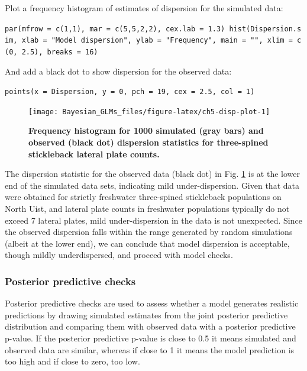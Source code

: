 \documentclass[
]{book}
\begin{document}
Plot a frequency histogram of estimates of dispersion for the simulated data:

\texttt{par(mfrow\ =\ c(1,1),\ mar\ =\ c(5,5,2,2),\ cex.lab\ =\ 1.3)\ hist(Dispersion.sim,\ xlab\ =\ "Model\ dispersion",\ ylab\ =\ "Frequency",\ main\ =\ "",\ xlim\ =\ c(0,\ 2.5),\ breaks\ =\ 16)}

And add a black dot to show dispersion for the observed data:

\texttt{points(x\ =\ Dispersion,\ y\ =\ 0,\ pch\ =\ 19,\ cex\ =\ 2.5,\ col\ =\ 1)}



\begin{figure}

{\centering \texttt{[image: Bayesian\_GLMs\_files/figure-latex/ch5-disp-plot-1]} 

}

\caption{\textbf{Frequency histogram for 1000 simulated (gray bars) and observed (black dot) dispersion statistics for three-spined stickleback lateral plate counts.}}\label{fig:ch5-disp-plot}
\end{figure}

The dispersion statistic for the observed data (black dot) in Fig. \ref{fig:ch5-disp-plot} is at the lower end of the simulated data sets, indicating mild under-dispersion. Given that data were obtained for strictly freshwater three-spined stickleback populations on North Uist, and lateral plate counts in freshwater populations typically do not exceed 7 lateral plates, mild under-dispersion in the data is not unexpected. Since the observed dispersion falls within the range generated by random simulations (albeit at the lower end), we can conclude that model dispersion is acceptable, though mildly underdispersed, and proceed with model checks.

\hypertarget{pois-ppc}{%
\subsubsection{Posterior predictive checks}\label{pois-ppc}}

Posterior predictive checks are used to assess whether a model generates realistic predictions by drawing simulated estimates from the joint posterior predictive distribution and comparing them with observed data with a posterior predictive p-value. If the posterior predictive p-value is close to 0.5 it means simulated and observed data are similar, whereas if close to 1 it means the model prediction is too high and if close to zero, too low.
\end{document}

